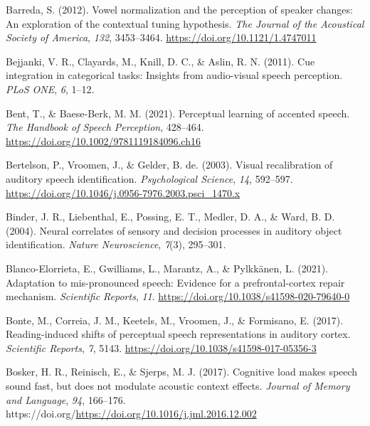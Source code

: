 \documentclass[
  11pt,
  english,
  man,floatsintext]{apa6}
\newlength{\cslhangindent}
\newlength{\cslentryspacingunit} %
\newenvironment{CSLReferences}[2] %
 {%
  \setlength{\parindent}{0pt}
  \ifodd #1
  \let\oldpar\par
  \def\par{\hangindent=\cslhangindent\oldpar}
  \fi
  \setlength{\parskip}{#2\cslentryspacingunit}
 }%
 {}
\begin{document}
\begin{CSLReferences}{1}{0}
\leavevmode{}%
Barreda, S. (2012). Vowel normalization and the perception of speaker changes: An exploration of the contextual tuning hypothesis. \emph{The Journal of the Acoustical Society of America}, \emph{132}, 3453--3464. \url{https://doi.org/10.1121/1.4747011}

\leavevmode{}%
Bejjanki, V. R., Clayards, M., Knill, D. C., \& Aslin, R. N. (2011). Cue integration in categorical tasks: Insights from audio-visual speech perception. \emph{PLoS ONE}, \emph{6}, 1--12.

\leavevmode{}%
Bent, T., \& Baese-Berk, M. M. (2021). Perceptual learning of accented speech. \emph{The Handbook of Speech Perception}, 428--464. \url{https://doi.org/10.1002/9781119184096.ch16}

\leavevmode{}%
Bertelson, P., Vroomen, J., \& Gelder, B. de. (2003). Visual recalibration of auditory speech identification. \emph{Psychological Science}, \emph{14}, 592--597. \url{https://doi.org/10.1046/j.0956-7976.2003.psci_1470.x}

\leavevmode{}%
Binder, J. R., Liebenthal, E., Possing, E. T., Medler, D. A., \& Ward, B. D. (2004). Neural correlates of sensory and decision processes in auditory object identification. \emph{Nature Neuroscience}, \emph{7}(3), 295--301.

\leavevmode{}%
Blanco-Elorrieta, E., Gwilliams, L., Marantz, A., \& Pylkkänen, L. (2021). Adaptation to mis-pronounced speech: Evidence for a prefrontal-cortex repair mechanism. \emph{Scientific Reports}, \emph{11}. \url{https://doi.org/10.1038/s41598-020-79640-0}

\leavevmode{}%
Bonte, M., Correia, J. M., Keetels, M., Vroomen, J., \& Formisano, E. (2017). Reading-induced shifts of perceptual speech representations in auditory cortex. \emph{Scientific Reports}, \emph{7}, 5143. \url{https://doi.org/10.1038/s41598-017-05356-3}

\leavevmode{}%
Bosker, H. R., Reinisch, E., \& Sjerps, M. J. (2017). Cognitive load makes speech sound fast, but does not modulate acoustic context effects. \emph{Journal of Memory and Language}, \emph{94}, 166--176. https://doi.org/\url{https://doi.org/10.1016/j.jml.2016.12.002}


\end{CSLReferences}
\end{document}

